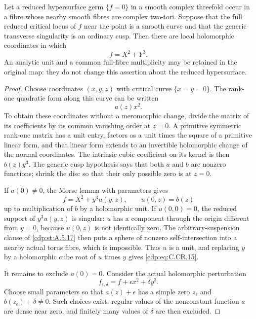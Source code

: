 
\begin{proposition}\label{cdp:st:C.2.CR.4}
Let a reduced hypersurface germ $\{f=0\}$ in a smooth
complex threefold occur in a fibre whose nearby smooth
fibres are complex two-tori. Suppose that the full reduced
critical locus of $f$ near the point is a smooth curve
and that the generic transverse singularity is an ordinary
cusp. Then there are local holomorphic coordinates in which
\[
                            f=X^2+Y^3.             \tag{C.CR.15}\label{cdp:eq:C.CR.15}
\]
An analytic unit and a common full-fibre multiplicity may
be retained in the original map: they do not change this
assertion about the reduced hypersurface.
\end{proposition}
\begin{proof}
Choose coordinates $(x,y,z)$ with critical curve
$\{x=y=0\}$. The rank-one quadratic form along this curve
can be written
\[
 a(z)x^2.
\]
To obtain these coordinates without a meromorphic change,
divide the matrix of its coefficients by its common
vanishing order at $z=0$. A primitive symmetric rank-one
matrix has a unit entry, factors as a unit times the
square of a primitive linear form, and that linear form
extends to an invertible holomorphic change of the normal
coordinates. The intrinsic cubic coefficient on its
kernel is then $b(z)y^3$. The generic cusp hypothesis says
that both $a$ and $b$ are nonzero functions; shrink the
disc so that their only possible zero is at $z=0$.

If $a(0)\ne0$, the Morse lemma with parameters gives
\[
 f=X^2+y^3u(y,z),\qquad u(0,z)=b(z)
\]
up to multiplication of $b$ by a holomorphic unit.
If $u(0,0)=0$, the reduced support of $y^3u(y,z)$ is
singular: $u$ has a component through the origin
different from $y=0$, because $u(0,z)$ is not identically
zero. The arbitrary-suspension clause of \ref{cdp:st:A.5.17} then
puts a sphere of nonzero self-intersection into a
nearby actual torus fibre, which is impossible.
Thus $u$ is a unit, and replacing $y$ by a holomorphic
cube root of $u$ times $y$ gives \eqref{cdp:eq:C.CR.15}.

It remains to exclude $a(0)=0$. Consider the actual
holomorphic perturbation
\[
                  f_{\epsilon,\delta}
                      =f+\epsilon x^2+\delta y^3.
 \tag{C.CR.16}\label{cdp:eq:C.CR.16}
\]
Choose small parameters so that $a(z)+\epsilon$ has a
simple zero $z_\epsilon$ and
$b(z_\epsilon)+\delta\ne0$. Such choices exist:
regular values of the nonconstant function $a$ are
dense near zero, and finitely many values of $\delta$
are then excluded.


\end{proof}
